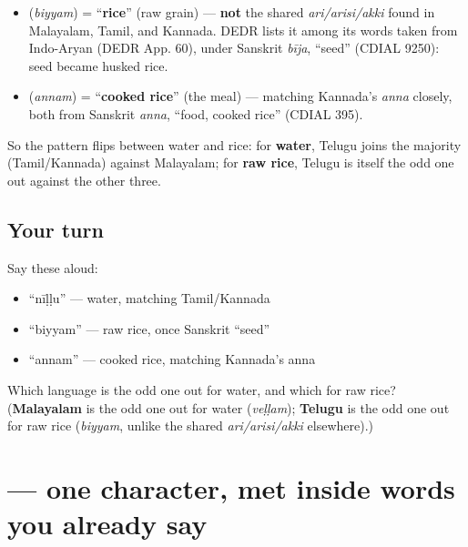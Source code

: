 \begin{cousinweb}
\begin{itemize}
\raggedright
  \item \textbf{} (\emph{biyyam}) = \textquotedblleft{}\textbf{rice}\textquotedblright{} (raw grain) — \textbf{not} the shared \emph{ari/arisi/akki} found in Malayalam, Tamil, and Kannada. DEDR lists it among its words taken from Indo-Aryan (DEDR App. 60), under Sanskrit \emph{bīja}, \textquotedblleft{}seed\textquotedblright{} (CDIAL 9250): seed became husked rice.
  \item \textbf{} (\emph{annam}) = \textquotedblleft{}\textbf{cooked rice}\textquotedblright{} (the meal) — matching Kannada's \emph{anna} closely, both from Sanskrit \emph{anna}, \textquotedblleft{}food, cooked rice\textquotedblright{} (CDIAL 395).
\end{itemize}

So the pattern flips between water and rice: for \textbf{water}, Telugu joins the majority (Tamil/Kannada) against Malayalam; for \textbf{raw rice}, Telugu is itself the odd one out against the other three.
\end{cousinweb}

\subsection*{Your turn}
Say these aloud:

\begin{itemize}
\raggedright
  \item \textquotedblleft{}nīḷḷu\textquotedblright{} — water, matching Tamil/Kannada
  \item \textquotedblleft{}biyyam\textquotedblright{} — raw rice, once Sanskrit \textquotedblleft{}seed\textquotedblright{}
  \item \textquotedblleft{}annam\textquotedblright{} — cooked rice, matching Kannada's anna
\end{itemize}

\begin{tcolorbox}[breakable,colback=teal!4,colframe=teal!35!black,title={Before you move on}]
Which language is the odd one out for water, and which for raw rice? (\textbf{Malayalam} is the odd one out for water (\emph{veḷḷam}); \textbf{Telugu} is the odd one out for raw rice (\emph{biyyam}, unlike the shared \emph{ari/arisi/akki} elsewhere).)
\end{tcolorbox}
\section[\texorpdfstring{\te{ీ} (ī)}{ీ (ī)}]{ — one character, met inside words you already say}

